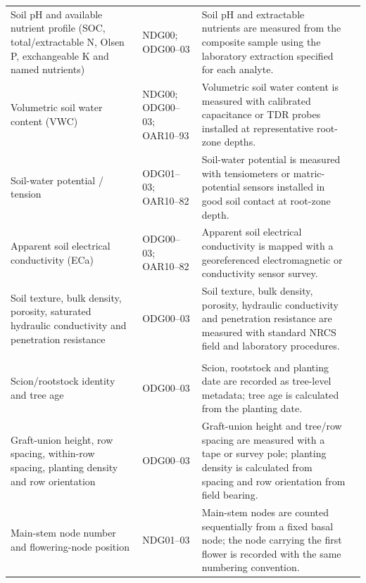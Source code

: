 \begin{landscape}
\begin{longtable}{>{\RaggedRight\arraybackslash}p{5.1cm} >{\RaggedRight\arraybackslash}p{2.3cm} >{\RaggedRight\arraybackslash}p{16.7cm} >{\RaggedRight\arraybackslash}p{2.4cm}}
Soil pH and available nutrient profile (SOC, total/extractable N, Olsen P, exchangeable K and named nutrients) &
NDG00; ODG00--03 &
Soil pH and extractable nutrients are measured from the composite sample using the laboratory extraction specified for each analyte. &
\citep{wsu_soil_sampling}\\

Volumetric soil water content (VWC) &
NDG00; ODG00--03; OAR10--93 &
Volumetric soil water content is measured with calibrated capacitance or TDR probes installed at representative root-zone depths. &
\citep{wsu_soil_moisture}\\

Soil-water potential / tension &
ODG01--03; OAR10--82 &
Soil-water potential is measured with tensiometers or matric-potential sensors installed in good soil contact at root-zone depth. &
\citep{wsu_soil_moisture}\\

Apparent soil electrical conductivity (ECa) &
ODG00--03; OAR10--82 &
Apparent soil electrical conductivity is mapped with a georeferenced electromagnetic or conductivity sensor survey. &
\citep{tsoulias2020}\\

Soil texture, bulk density, porosity, saturated hydraulic conductivity and penetration resistance &
ODG00--03 &
Soil texture, bulk density, porosity, hydraulic conductivity and penetration resistance are measured with standard NRCS field and laboratory procedures. &
\citep{nrcs2024fieldbook}\\

\multicolumn{4}{l}{\textbf{Tree identity, establishment and natural developmental traits}}\\
Scion/rootstock identity and tree age &
ODG00--03 &
Scion, rootstock and planting date are recorded as tree-level metadata; tree age is calculated from the planting date. &
\citep{ferree2003}\\

Graft-union height, row spacing, within-row spacing, planting density and row orientation &
ODG00--03 &
Graft-union height and tree/row spacing are measured with a tape or survey pole; planting density is calculated from spacing and row orientation from field bearing. &
\citep{sun2020,ferree2003}\\

Main-stem node number and flowering-node position &
NDG01--03 &
Main-stem nodes are counted sequentially from a fixed basal node; the node carrying the first flower is recorded with the same numbering convention. &
\citep{liu2025,zhang2007,atay2020}\\


\end{longtable}
\end{landscape}
